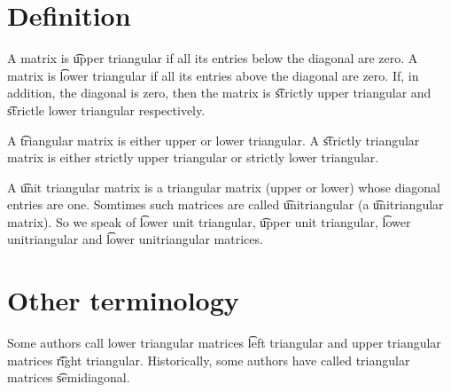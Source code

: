 
\section*{Definition}

A matrix is \t{upper triangular} if all its entries below the diagonal are zero.
A matrix is \t{lower triangular} if all its entries above the diagonal are zero.
If, in addition, the diagonal is zero, then the matrix is \t{strictly upper triangular} and \t{strictle lower triangular} respectively.

A \t{triangular} matrix is either upper or lower triangular.
A \t{strictly triangular} matrix is either strictly upper triangular or strictly lower triangular.

A \t{unit triangular matrix} is a triangular matrix (upper or lower) whose diagonal entries are one.
Somtimes such matrices are called \t{unitriangular} (a \t{unitriangular matrix}).
So we speak of \t{lower unit triangular}, \t{upper unit triangular}, \t{lower unitriangular} and \t{lower unitriangular} matrices.

\section*{Other terminology}

Some authors call lower triangular matrices \t{left triangular} and upper triangular matrices \t{right triangular}.
Historically, some authors have called triangular matrices \t{semidiagonal}.

\blankpage